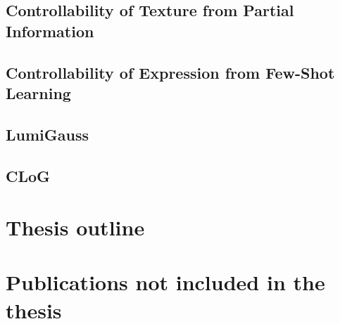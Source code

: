   \subsection{Controllability of Texture from Partial Information}
  \subsection{Controllability of Expression from Few-Shot Learning}
  \subsection{LumiGauss}
  \subsection{CLoG}
\section{Thesis outline}

\section{Publications not included in the thesis}
